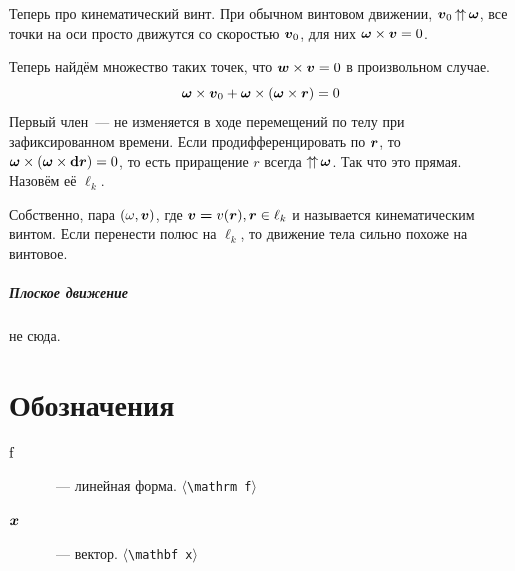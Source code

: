 \documentclass[timbord]{longnotes}
\begin{document}
Теперь про кинематический винт. При обычном винтовом движении, $\v v_0 \coori \v\omega $,
все точки на оси просто движутся со скоростью $\v v_0$, для них $\v \omega \times \v v =0$.

Теперь найдём множество таких точек, что $\v w \times \v v = 0$ в произвольном случае.
\[
  \v \omega \times \v v_0 + \v \omega \times (\v \omega \times \v r) = 0
\]
Первый член~--- не изменяется в ходе перемещений по телу при зафиксированном времени.
Если продифференцировать по $\v r$, то $\v \omega \times (\v \omega \times \v {\del r}) = 0$, 
то есть приращение $r$ всегда $\coori \v \omega $. Так что это прямая. Назовём её $\ell_k$.

Собственно, пара $(\omega, \v v)$, где $\v v\v =v(\v r), \v r \in \ell_k$ и называется кинематическим
винтом. Если перенести полюс на $\ell_k$, то движение тела сильно похоже на винтовое.

\paragraph{Плоское движение}
не сюда.

\appendix
\chapter{Обозначения}
\begin{description}
  \item[$\v*{f}$]~--- линейная форма. \hfill$\langle$\verb+\mathrm f+$\rangle$
  \item[$\v{x}$]~--- вектор. \hfill$\langle$\verb+\mathbf x+$\rangle$
\end{description}
\end{document}
